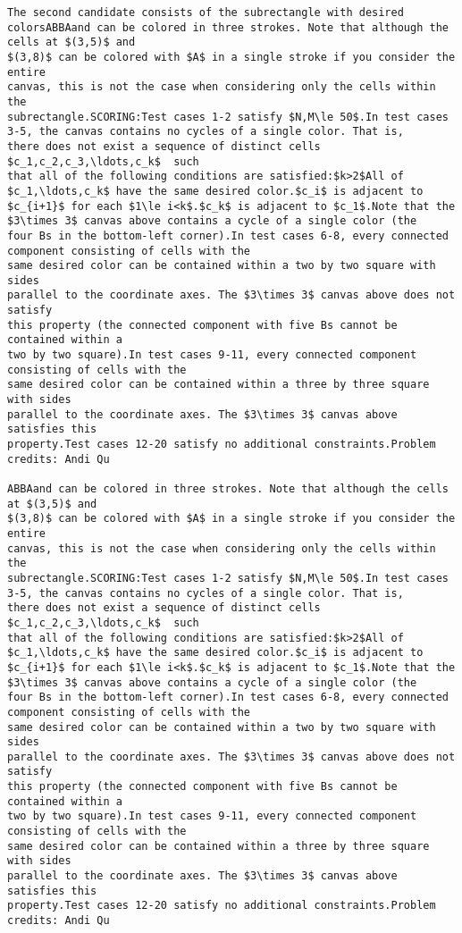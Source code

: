 \documentclass[12pt]{article}
\begin{document}
\begin{verbatim}
The second candidate consists of the subrectangle with desired colorsABBAand can be colored in three strokes. Note that although the cells at $(3,5)$ and
$(3,8)$ can be colored with $A$ in a single stroke if you consider the entire
canvas, this is not the case when considering only the cells within the
subrectangle.SCORING:Test cases 1-2 satisfy $N,M\le 50$.In test cases 3-5, the canvas contains no cycles of a single color. That is,
there does not exist a sequence of distinct cells $c_1,c_2,c_3,\ldots,c_k$  such
that all of the following conditions are satisfied:$k>2$All of $c_1,\ldots,c_k$ have the same desired color.$c_i$ is adjacent to $c_{i+1}$ for each $1\le i<k$.$c_k$ is adjacent to $c_1$.Note that the $3\times 3$ canvas above contains a cycle of a single color (the
four Bs in the bottom-left corner).In test cases 6-8, every connected component consisting of cells with the
same desired color can be contained within a two by two square with sides
parallel to the coordinate axes. The $3\times 3$ canvas above does not satisfy
this property (the connected component with five Bs cannot be contained within a
two by two square).In test cases 9-11, every connected component consisting of cells with the
same desired color can be contained within a three by three square with sides
parallel to the coordinate axes. The $3\times 3$ canvas above satisfies this
property.Test cases 12-20 satisfy no additional constraints.Problem credits: Andi Qu

ABBAand can be colored in three strokes. Note that although the cells at $(3,5)$ and
$(3,8)$ can be colored with $A$ in a single stroke if you consider the entire
canvas, this is not the case when considering only the cells within the
subrectangle.SCORING:Test cases 1-2 satisfy $N,M\le 50$.In test cases 3-5, the canvas contains no cycles of a single color. That is,
there does not exist a sequence of distinct cells $c_1,c_2,c_3,\ldots,c_k$  such
that all of the following conditions are satisfied:$k>2$All of $c_1,\ldots,c_k$ have the same desired color.$c_i$ is adjacent to $c_{i+1}$ for each $1\le i<k$.$c_k$ is adjacent to $c_1$.Note that the $3\times 3$ canvas above contains a cycle of a single color (the
four Bs in the bottom-left corner).In test cases 6-8, every connected component consisting of cells with the
same desired color can be contained within a two by two square with sides
parallel to the coordinate axes. The $3\times 3$ canvas above does not satisfy
this property (the connected component with five Bs cannot be contained within a
two by two square).In test cases 9-11, every connected component consisting of cells with the
same desired color can be contained within a three by three square with sides
parallel to the coordinate axes. The $3\times 3$ canvas above satisfies this
property.Test cases 12-20 satisfy no additional constraints.Problem credits: Andi Qu


\end{verbatim}
\end{document}
